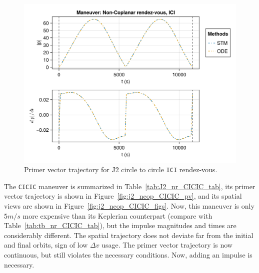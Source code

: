 \begin{figure}[htbp]
    \centering
    \includegraphics[width=\linewidth]{../results/j2/ipv_noncop/ICI_primer_vector.png}
    \caption{Primer vector trajectory for J2 circle to circle \texttt{ICI} rendez-vous.}
    \label{fig:j2_ncop_ICI_pv}
\end{figure}

The \texttt{CICIC} maneuver is summarized in Table~\ref{tab:J2_nr_CICIC_tab}, its primer vector trajectory is shown in Figure~\ref{fig:j2_ncop_CICIC_pv}, and its spatial views are shown in Figure~\ref{fig:j2_ncop_CICIC_figs}. Now, this maneuver is only \(5 m/s\) more expensive than its Keplerian counterpart (compare with Table~\ref{tab:tb_nr_CICIC_tab}), but the impulse magnitudes and times are considerably different. The spatial trajectory does not deviate far from the initial and final orbits, sign of low \(\Delta v\) usage. The primer vector trajectory is now continuous, but still violates the necessary conditions. Now, adding an impulse is necessary.


